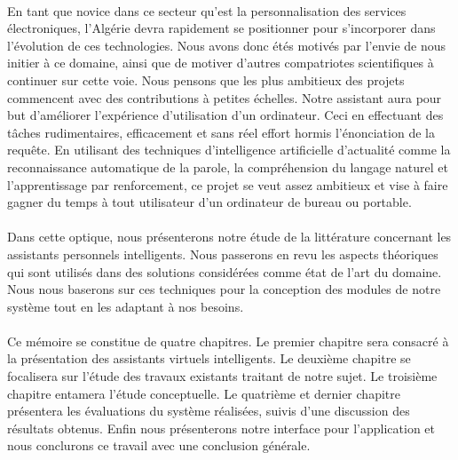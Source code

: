 \paragraph{}
En tant que novice dans ce secteur qu'est la personnalisation des services électroniques, l'Algérie devra rapidement se positionner pour s'incorporer dans l'évolution de ces technologies. Nous avons donc étés motivés par l'envie de nous initier à ce domaine, ainsi que de motiver d'autres compatriotes scientifiques à continuer sur cette voie. Nous pensons que les plus ambitieux des projets commencent avec des contributions à petites échelles. Notre assistant aura pour but d'améliorer l'expérience d'utilisation d'un ordinateur. Ceci en effectuant des tâches rudimentaires, efficacement et sans réel effort hormis l'énonciation de la requête. En utilisant des techniques d'intelligence artificielle d'actualité comme la reconnaissance automatique de la parole, la compréhension du langage naturel et l'apprentissage par renforcement, ce projet se veut assez ambitieux et vise à faire gagner du temps à tout utilisateur d'un ordinateur de bureau ou portable.
	
\paragraph{}
Dans cette optique, nous présenterons notre étude de la littérature concernant les assistants personnels intelligents. Nous passerons en revu les aspects théoriques qui sont utilisés dans des solutions considérées comme état de l'art du domaine. Nous nous baserons sur ces techniques pour la conception des modules de notre système tout en les adaptant à nos besoins. 

\paragraph{}
Ce mémoire se constitue de quatre chapitres. Le premier chapitre sera consacré à la présentation des assistants virtuels intelligents. Le deuxième chapitre se focalisera sur l'étude des travaux existants traitant de notre sujet. Le troisième chapitre entamera l'étude conceptuelle. Le quatrième et dernier chapitre présentera les évaluations du système réalisées, suivis d'une discussion des résultats obtenus. Enfin nous présenterons notre interface pour l'application et nous conclurons ce travail avec une conclusion générale.
